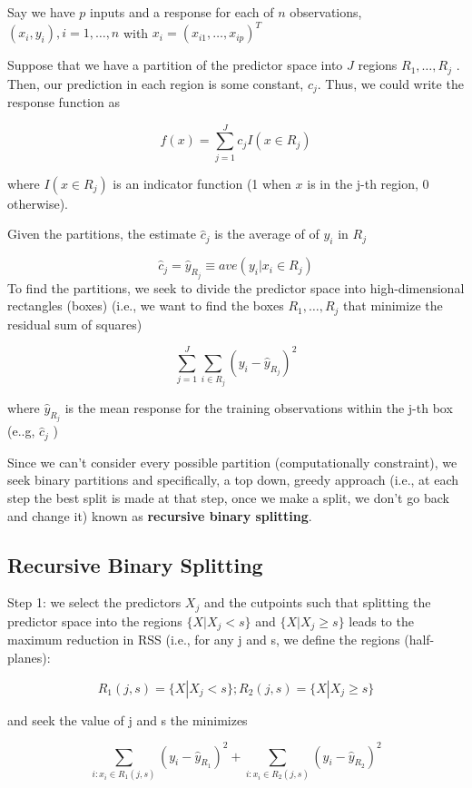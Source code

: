 \documentclass[
]{book}
\begin{document}
Say we have \(p\) inputs and a response for each of \(n\) observations, \((x_i, y_i), i = 1, \dots, n\) with \(x_i = (x_{i1}, \dots , x_{ip})^T\)

Suppose that we have a partition of the predictor space into \(J\) regions \(R_1, \dots, R_j\) . Then, our prediction in each region is some constant, \(c_j\). Thus, we could write the response function as

\[
f(x) = \sum_{j=1}^J c_j I (x \in R_j)
\]

where \(I(x \in R_j)\) is an indicator function (1 when \(x\) is in the j-th region, 0 otherwise).

Given the partitions, the estimate \(\hat{c}_j\) is the average of of \(y_i\) in \(R_j\)

\[\hat{c}_j = \hat{y}_{R_j} \equiv ave(y_i |x_i \in R_j)\] To find the partitions, we seek to divide the predictor space into high-dimensional rectangles (boxes) (i.e., we want to find the boxes \(R_1, \dots, R_j\) that minimize the residual sum of squares)

\[
\sum_{j=1}^J \sum_{i \in R_j} (y_i - \hat{y}_{R_j})^2
\]

where \(\hat{y}_{R_j}\) is the mean response for the training observations within the j-th box (e..g, \(\hat{c}_j\) )

Since we can't consider every possible partition (computationally constraint), we seek binary partitions and specifically, a top down, greedy approach (i.e., at each step the best split is made at that step, once we make a split, we don't go back and change it) known as \textbf{recursive binary splitting}.

\hypertarget{recursive-binary-splitting}{%
\subsection{Recursive Binary Splitting}\label{recursive-binary-splitting}}

Step 1: we select the predictors \(X_j\) and the cutpoints such that splitting the predictor space into the regions \(\{ X|X_j <s\}\) and \(\{ X | X_j \ge s\}\) leads to the maximum reduction in RSS (i.e., for any j and s, we define the regions (half-planes):

\[
R_1 (j,s) = \{ X|X_j <s\} ; R_2(j,s) = \{ X|X_j \ge s\}
\]

and seek the value of j and s the minimizes

\[
\sum_{i: x_i \in R_1 (j,s)} (y_i - \hat{y}_{R_1})^2 + \sum_{i: x_i \in R_2 (j,s)} (y_i - \hat{y}_{R_2})^2
\]
\end{document}
